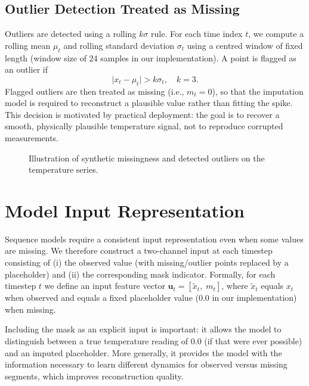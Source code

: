 \subsection{Outlier Detection Treated as Missing}
Outliers are detected using a rolling $k\sigma$ rule. For each time index $t$, we compute a rolling mean $\mu_t$ and rolling standard deviation $\sigma_t$ using a centred window of fixed length (window size of 24 samples in our implementation). A point is flagged as an outlier if
\[
\lvert x_t - \mu_t \rvert > k \sigma_t,\quad k=3.
\]
Flagged outliers are then treated as missing (i.e., $m_t=0$), so that the imputation model is required to reconstruct a plausible value rather than fitting the spike. This decision is motivated by practical deployment: the goal is to recover a smooth, physically plausible temperature signal, not to reproduce corrupted measurements.

\begin{figure}[ht]
	\centering
	\caption{Illustration of synthetic missingness and detected outliers on the temperature series.}
	\label{fig:mask-visualisation}
\end{figure}

\section{Model Input Representation}
Sequence models require a consistent input representation even when some values are missing. We therefore construct a two-channel input at each timestep consisting of (i) the observed value (with missing/outlier points replaced by a placeholder) and (ii) the corresponding mask indicator. Formally, for each timestep $t$ we define an input feature vector $\mathbf{u}_t = [\tilde{x}_t,\; m_t]$, where $\tilde{x}_t$ equals $x_t$ when observed and equals a fixed placeholder value (0.0 in our implementation) when missing.

Including the mask as an explicit input is important: it allows the model to distinguish between a true temperature reading of 0.0 (if that were ever possible) and an imputed placeholder. More generally, it provides the model with the information necessary to learn different dynamics for observed versus missing segments, which improves reconstruction quality.

